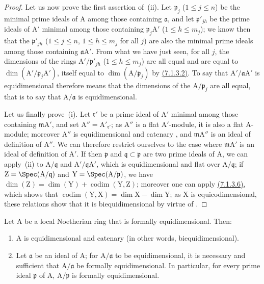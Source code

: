 \begin{proof}
Let us now prove the first assertion of~(ii).
Let $\mathfrak{p}_j$ ($1\leqslant j\leqslant n$) be the minimal prime ideals of $\mathrm{A}$ among those containing $\mathfrak{a}$, and let $\mathfrak{p}'_{jh}$ be the prime ideals of $\mathrm{A}'$ minimal among those containing $\mathfrak{p}_j\mathrm{A}'$ ($1\leqslant h\leqslant m_j$); we know then  that the $\mathfrak{p}'_{jh}$ ($1\leqslant j\leqslant n$, $1\leqslant h\leqslant m_j$ for all $j$) are also the minimal prime ideals among those containing $\mathfrak{a}\mathrm{A}'$.
From what we have just seen, for all $j$, the dimensions of the rings $\mathrm{A}'/\mathfrak{p}'_{jh}$ ($1\leqslant h\leqslant m_j$) are all equal and are equal to $\dim(\mathrm{A}'/\mathfrak{p}_j\mathrm{A}')$, itself equal to $\dim(\mathrm{A}/\mathfrak{p}_j)$ by \hyperref[IV.7.1.3.2]{(7.1.3.2)}.
To say that $\mathrm{A}'/\mathfrak{a}\mathrm{A}'$ is equidimensional therefore means that the dimensions of the $\mathrm{A}/\mathfrak{p}_j$ are all equal, that is to say that $\mathrm{A}/\mathfrak{a}$ is equidimensional.

Let us finally prove~(i).
Let $\mathfrak{r}'$ be a prime ideal of $\mathrm{A}'$ minimal among those containing $\mathfrak{m}\mathrm{A}'$, and set $\mathrm{A}''=\mathrm{A}'_{\mathfrak{r}'}$; as $\mathrm{A}''$ is a flat $\mathrm{A}'$-module, it is also a flat $\mathrm{A}$-module; moreover $\mathrm{A}''$ is equidimensional and catenary , and $\mathfrak{m}\mathrm{A}''$ is an ideal of definition of $\mathrm{A}''$.
We can therefore restrict ourselves to the case where $\mathfrak{m}\mathrm{A}'$ is an ideal of definition of $\mathrm{A}'$.
If then $\mathfrak{p}$ and $\mathfrak{q}\subset\mathfrak{p}$ are two prime ideals of $\mathrm{A}$, we can apply~(ii) to $\mathrm{A}/\mathfrak{q}$ and $\mathrm{A}'/\mathfrak{q}\mathrm{A}'$, which is equidimensional and flat over $\mathrm{A}/\mathfrak{q}$; if $\mathrm{Z}=\Spec(\mathrm{A}/\mathfrak{q})$ and $\mathrm{Y}=\Spec(\mathrm{A}/\mathfrak{p})$, we have
$\dim(\mathrm{Z})=\dim(\mathrm{Y})+\operatorname{codim}(\mathrm{Y},\mathrm{Z})$;
moreover one can apply \hyperref[IV.7.1.3.6]{(7.1.3.6)}, which shows that $\operatorname{codim}(\mathrm{Y},\mathrm{X})=\dim\mathrm{X}-\dim\mathrm{Y}$; as $\mathrm{X}$ is equicodimensional, these relations show that it is biequidimensional by virtue of .
\end{proof}

\begin{corollary}[7.1.4]
\label{IV.7.1.4}
Let $\mathrm{A}$ be a local Noetherian ring that is formally equidimensional.
Then:
\begin{enumerate}[label=\emph{\roman*)}]
  \item $\mathrm{A}$ is equidimensional and catenary (in other words, biequidimensional).
  \item Let $\mathfrak{a}$ be an ideal of $\mathrm{A}$; for $\mathrm{A}/\mathfrak{a}$ to be equidimensional, it is necessary and sufficient that $\mathrm{A}/\mathfrak{a}$ be formally equidimensional.
  In particular, for every prime ideal $\mathfrak{p}$ of $\mathrm{A}$, $\mathrm{A}/\mathfrak{p}$ is formally equidimensional.
\end{enumerate}
\end{corollary}

